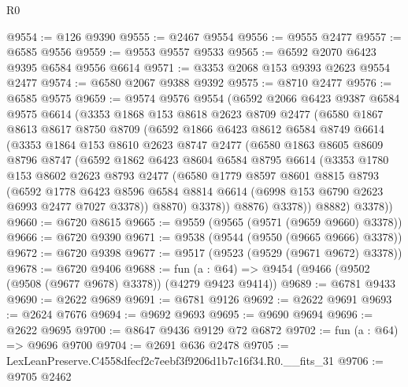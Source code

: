 \begin{lexlean}{R0}
\begin{coremodule}
@9554 := @126 @9390
@9555 := @2467 @9554
@9556 := @9555 @2477
@9557 := @6585 @9556
@9559 := @9553 @9557 @9533
@9565 := @6592 @2070 @6423 @9395 @6584 @9556 @6614
@9571 := @3353 @2068 @153 @9393 @2623 @9554 @2477
@9574 := @6580 @2067 @9388 @9392
@9575 := @8710 @2477
@9576 := @6585 @9575
@9659 := @9574
    @9576
    @9554
    (@6592
      @2066
      @6423
      @9387
      @6584
      @9575
      @6614
      (@3353
        @1868
        @153
        @8618
        @2623
        @8709
        @2477
        (@6580
          @1867
          @8613
          @8617
          @8750
          @8709
          (@6592
            @1866
            @6423
            @8612
            @6584
            @8749
            @6614
            (@3353
              @1864
              @153
              @8610
              @2623
              @8747
              @2477
              (@6580
                @1863
                @8605
                @8609
                @8796
                @8747
                (@6592
                  @1862
                  @6423
                  @8604
                  @6584
                  @8795
                  @6614
                  (@3353
                    @1780
                    @153
                    @8602
                    @2623
                    @8793
                    @2477
                    (@6580
                      @1779
                      @8597
                      @8601
                      @8815
                      @8793
                      (@6592
                        @1778
                        @6423
                        @8596
                        @6584
                        @8814
                        @6614
                        (@6998 @153 @6790 @2623 @6993 @2477 @7027 @3378))
                      @8870)
                    @3378))
                @8876)
              @3378))
          @8882)
        @3378))
@9660 := @6720 @8615
@9665 := @9559 (@9565 (@9571 (@9659 @9660) @3378))
@9666 := @6720 @9390
@9671 := @9538 (@9544 (@9550 (@9665 @9666) @3378))
@9672 := @6720 @9398
@9677 := @9517 (@9523 (@9529 (@9671 @9672) @3378))
@9678 := @6720 @9406
@9688 := fun (a : @64) => @9454 (@9466 (@9502 (@9508 (@9677 @9678) @3378)) (@4279 @9423 @9414))
@9689 := @6781 @9433
@9690 := @2622 @9689
@9691 := @6781 @9126
@9692 := @2622 @9691
@9693 := @2624 @7676
@9694 := @9692 @9693
@9695 := @9690 @9694
@9696 := @2622 @9695
@9700 := @8647 @9436 @9129 @72 @6872
@9702 := fun (a : @64) => @9696 @9700
@9704 := @2691 @636 @2478
@9705 := LexLeanPreserve.C4558dfecf2c7eebf3f9206d1b7c16f34.R0.__fits_31
@9706 := @9705 @2462

\end{coremodule}
\end{lexlean}
